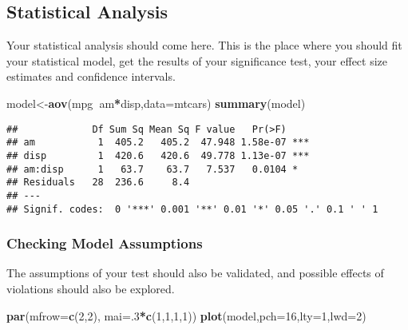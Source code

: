 \documentclass[]{article}
\newenvironment{Shaded}{\begin{snugshade}}{\end{snugshade}}
\newcommand{\DataTypeTok}[1]{\textcolor[rgb]{0.13,0.29,0.53}{#1}}
\newcommand{\DecValTok}[1]{\textcolor[rgb]{0.00,0.00,0.81}{#1}}
\newcommand{\KeywordTok}[1]{\textcolor[rgb]{0.13,0.29,0.53}{\textbf{#1}}}
\newcommand{\NormalTok}[1]{#1}
\newcommand{\OperatorTok}[1]{\textcolor[rgb]{0.81,0.36,0.00}{\textbf{#1}}}
\begin{document}
\hypertarget{statistical-analysis}{%
\subsection{Statistical Analysis}\label{statistical-analysis}}

Your statistical analysis should come here. This is the place where you
should fit your statistical model, get the results of your significance
test, your effect size estimates and confidence intervals.

\begin{Shaded}
\begin{Highlighting}[]
\NormalTok{model<-}\KeywordTok{aov}\NormalTok{(mpg}\OperatorTok{~}\NormalTok{am}\OperatorTok{*}\NormalTok{disp,}\DataTypeTok{data=}\NormalTok{mtcars)}
\KeywordTok{summary}\NormalTok{(model)}
\end{Highlighting}
\end{Shaded}

\begin{verbatim}
##             Df Sum Sq Mean Sq F value   Pr(>F)    
## am           1  405.2   405.2  47.948 1.58e-07 ***
## disp         1  420.6   420.6  49.778 1.13e-07 ***
## am:disp      1   63.7    63.7   7.537   0.0104 *  
## Residuals   28  236.6     8.4                     
## ---
## Signif. codes:  0 '***' 0.001 '**' 0.01 '*' 0.05 '.' 0.1 ' ' 1
\end{verbatim}

\hypertarget{checking-model-assumptions}{%
\subsubsection{Checking Model
Assumptions}\label{checking-model-assumptions}}

The assumptions of your test should also be validated, and possible
effects of violations should also be explored.

\begin{Shaded}
\begin{Highlighting}[]
\KeywordTok{par}\NormalTok{(}\DataTypeTok{mfrow=}\KeywordTok{c}\NormalTok{(}\DecValTok{2}\NormalTok{,}\DecValTok{2}\NormalTok{), }\DataTypeTok{mai=}\NormalTok{.}\DecValTok{3}\OperatorTok{*}\KeywordTok{c}\NormalTok{(}\DecValTok{1}\NormalTok{,}\DecValTok{1}\NormalTok{,}\DecValTok{1}\NormalTok{,}\DecValTok{1}\NormalTok{))}
\KeywordTok{plot}\NormalTok{(model,}\DataTypeTok{pch=}\DecValTok{16}\NormalTok{,}\DataTypeTok{lty=}\DecValTok{1}\NormalTok{,}\DataTypeTok{lwd=}\DecValTok{2}\NormalTok{)}
\end{Highlighting}
\end{Shaded}
\end{document}

